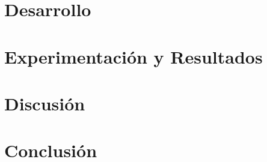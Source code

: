 \documentclass{article}
\begin{document}
  \section{Desarrollo} \label{development}

  \section{Experimentación y Resultados} \label{results}

  \section{Discusión} \label{discussion}

  \section{Conclusión} \label{conclussion}
  
\end{document}
